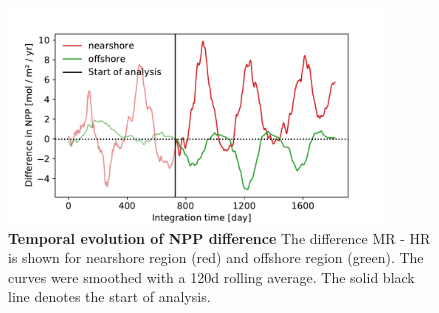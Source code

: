 \begin{figure}
    \centering
    \includegraphics[width=10cm]{../figures/result_npp_drift.pdf}
    \caption[Temporal evolution of NPP difference]{\textbf{Temporal evolution of NPP difference} The difference MR - HR is shown for nearshore region (red) and offshore region (green). The curves were smoothed with a 120d rolling average. The solid black line denotes the start of analysis.}
    \label{fig:npp_drift}
\end{figure}